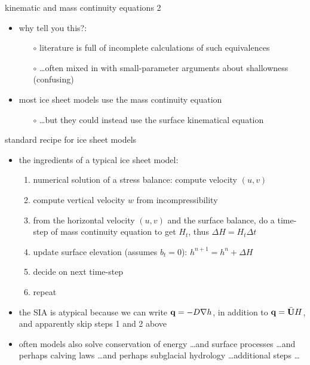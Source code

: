 \begin{frame}{kinematic and mass continuity equations 2}

\begin{itemize}
\item why tell you this?:
  \begin{itemize}
  \item[$\circ$] literature is full of incomplete calculations of such equivalences
  \item[$\circ$] \dots often mixed in with small-parameter arguments about shallowness (confusing)
  \end{itemize}
\item most ice sheet models use the mass continuity equation
  \begin{itemize}
  \item[$\circ$] \dots but they could instead use the surface kinematical equation
  \end{itemize}
\end{itemize}
\end{frame}


\begin{frame}{standard recipe for ice sheet models}

\begin{itemize}
\item the ingredients of a typical ice sheet model:
  \begin{enumerate}
  \item numerical solution of a stress balance: compute velocity $(u,v)$
  \item compute vertical velocity $w$ from incompressibility
  \item from the horizontal velocity $(u,v)$ and the surface balance, do a time-step of mass continuity equation to get $H_t$, thus $\Delta H = H_t \Delta t$
  \item update surface elevation (assumes $b_t=0$): \quad $h^{n+1} = h^{n} + \Delta H$
  \item decide on next time-step
  \item repeat
  \end{enumerate}

\bigskip
\item<2-> the SIA is atypical because we can write $\mathbf{q} = -D \nabla h$, in addition to $\mathbf{q} = \bar {\mathbf{U}} H$, and apparently skip steps 1 and 2 above

\bigskip
\item<3> often models also solve conservation of energy \dots and surface processes \dots and perhaps calving laws \dots and perhaps subglacial hydrology \dots additional steps \dots
\end{itemize}
\end{frame}
